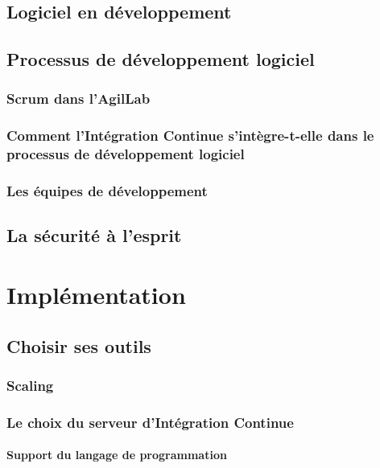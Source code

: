 \documentclass{report}
\begin{document}
      \section{Logiciel en développement}

      \section{Processus de développement logiciel}

        \subsection{Scrum dans l'AgilLab}

        \subsection{Comment l’Intégration Continue s’intègre-t-elle dans le processus de développement logiciel}

        \subsection{Les équipes de développement}

      \section{La sécurité à l'esprit}

    \chapter{Implémentation}

      \section{Choisir ses outils}

        \subsection{Scaling}

        \subsection{Le choix du serveur d’Intégration Continue}
          \subsubsection{Support du langage de programmation}
\end{document}
